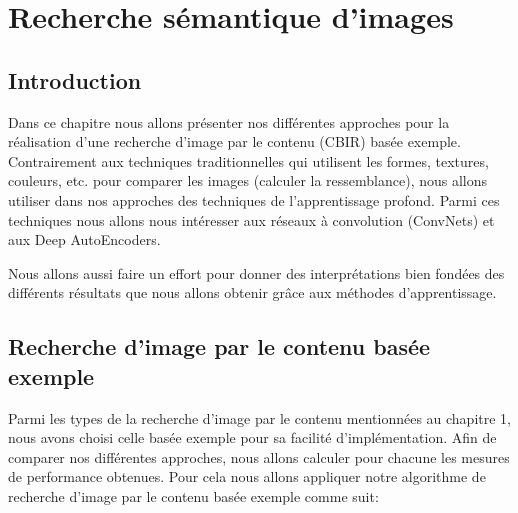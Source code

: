 
\chapter{Recherche sémantique d'images} %

\section{Introduction}
	Dans ce chapitre nous allons présenter nos différentes approches pour la réalisation d'une recherche d'image par le contenu (CBIR) basée exemple. Contrairement aux techniques traditionnelles qui utilisent les formes, textures, couleurs, etc. pour comparer les images (calculer la ressemblance), nous allons utiliser dans nos approches des techniques de l'apprentissage profond. Parmi ces techniques nous allons nous intéresser aux réseaux à convolution (ConvNets) et aux Deep AutoEncoders.

Nous allons aussi faire un effort pour donner des interprétations bien fondées des différents résultats que nous allons obtenir grâce aux méthodes d'apprentissage.

\section{Recherche d'image par le contenu basée exemple}
	Parmi les types de la recherche d'image par le contenu mentionnées au chapitre 1, nous avons choisi celle basée exemple pour sa facilité d'implémentation. Afin de comparer nos différentes approches, nous allons calculer pour chacune les mesures de performance obtenues. Pour cela nous allons appliquer notre algorithme de recherche d'image par le contenu basée exemple comme suit:

